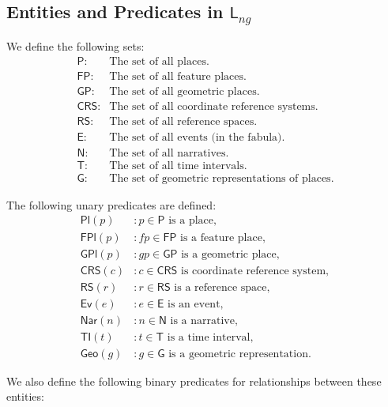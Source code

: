 \subsection{Entities and Predicates in \( \textsf{L}_{ng} \)}\label{V-subsec:lng}

We define the following sets:
\begin{align*}
    \textsf{P}: &  \text{The set of all places.} \\
    \textsf{FP}: & \text{The set of all feature places.} \\
    \textsf{GP}: & \text{The set of all geometric places.} \\
    \textsf{CRS}: & \text{The set of all coordinate reference systems.} \\
    \textsf{RS}: & \text{The set of all reference spaces.} \\
    \textsf{E}: & \text{The set of all events (in the fabula).} \\
    \textsf{N}: & \text{The set of all narratives.} \\
    \textsf{T}: & \text{The set of all time intervals.} \\
    \textsf{G}: & \text{The set of geometric representations of places.}
\end{align*}

The following unary predicates are defined:
\begin{align*}
    \textsf{Pl}(p) &: p \in \textsf{P} \text{ is a place}, \\
    \textsf{FPl}(p) &: fp \in \textsf{FP} \text{ is a feature place}, \\
    \textsf{GPl}(p) &: gp \in \textsf{GP} \text{ is a geometric place}, \\
    \textsf{CRS}(c) &: c \in \textsf{CRS} \text{ is coordinate reference system}, \\
    \textsf{RS}(r) &: r \in \textsf{RS} \text{ is a reference space}, \\
    \textsf{Ev}(e) &: e \in \textsf{E} \text{ is an event}, \\
    \textsf{Nar}(n) &: n \in \textsf{N} \text{ is a narrative}, \\
    \textsf{TI}(t) &: t \in \textsf{T} \text{ is a time interval}, \\
    \textsf{Geo}(g) &: g \in \textsf{G} \text{ is a geometric representation}.
\end{align*}

We also define the following binary predicates for relationships between these entities:

